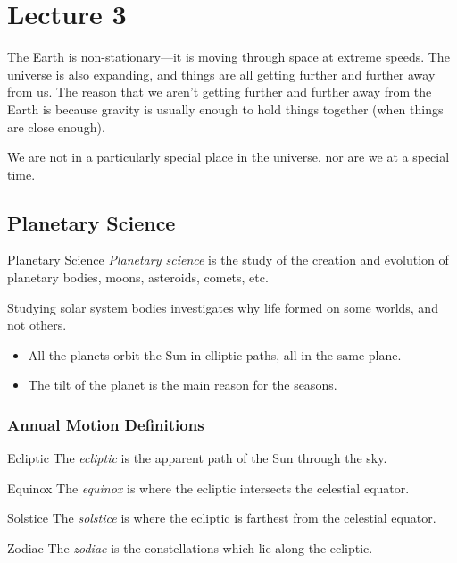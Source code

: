\documentclass[class=article, crop=false]{standalone}
\begin{document}
  \section{Lecture 3}
  The Earth is non-stationary---it is moving through space at extreme speeds. The universe is also expanding, and things are all getting further and further away from us. The reason that we aren't getting further and further away from the Earth is because gravity is usually enough to hold things together (when things are close enough).
  \begin{note}{}
    We are not in a particularly special place in the universe, nor are we at a special time.
  \end{note}
  \subsection{Planetary Science}
  \begin{definition}{Planetary Science}
    \emph{Planetary science} is the study of the creation and evolution of planetary bodies, moons, asteroids, comets, etc.
  \end{definition}
  Studying solar system bodies investigates why life formed on some worlds, and not others.
  \begin{itemize}
    \item All the planets orbit the Sun in elliptic paths, all in the same plane. 
    \item The tilt of the planet is the main reason for the seasons.
  \end{itemize}
  \subsubsection{Annual Motion Definitions}
  \begin{definition}{Ecliptic}
    The \emph{ecliptic} is the apparent path of the Sun through the sky.
  \end{definition}
  \begin{definition}{Equinox}
    The \emph{equinox} is where the ecliptic intersects the celestial equator.
  \end{definition}
  \begin{definition}{Solstice}
    The \emph{solstice} is where the ecliptic is farthest from the celestial equator.
  \end{definition}
  \begin{definition}{Zodiac}
    The \emph{zodiac} is the constellations which lie along the ecliptic.
  \end{definition}
\end{document}
